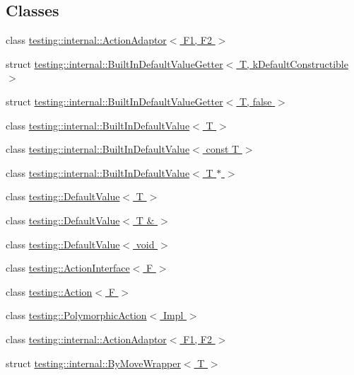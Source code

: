 \subsection*{Classes}
\begin{DoxyCompactItemize}
\item 
class \hyperlink{classtesting_1_1internal_1_1_action_adaptor}{testing\+::internal\+::\+Action\+Adaptor$<$ F1, F2 $>$}
\item 
struct \hyperlink{structtesting_1_1internal_1_1_built_in_default_value_getter}{testing\+::internal\+::\+Built\+In\+Default\+Value\+Getter$<$ T, k\+Default\+Constructible $>$}
\item 
struct \hyperlink{structtesting_1_1internal_1_1_built_in_default_value_getter_3_01_t_00_01false_01_4}{testing\+::internal\+::\+Built\+In\+Default\+Value\+Getter$<$ T, false $>$}
\item 
class \hyperlink{classtesting_1_1internal_1_1_built_in_default_value}{testing\+::internal\+::\+Built\+In\+Default\+Value$<$ T $>$}
\item 
class \hyperlink{classtesting_1_1internal_1_1_built_in_default_value_3_01const_01_t_01_4}{testing\+::internal\+::\+Built\+In\+Default\+Value$<$ const T $>$}
\item 
class \hyperlink{classtesting_1_1internal_1_1_built_in_default_value_3_01_t_01_5_01_4}{testing\+::internal\+::\+Built\+In\+Default\+Value$<$ T $\ast$ $>$}
\item 
class \hyperlink{classtesting_1_1_default_value}{testing\+::\+Default\+Value$<$ T $>$}
\item 
class \hyperlink{classtesting_1_1_default_value_3_01_t_01_6_01_4}{testing\+::\+Default\+Value$<$ T \& $>$}
\item 
class \hyperlink{classtesting_1_1_default_value_3_01void_01_4}{testing\+::\+Default\+Value$<$ void $>$}
\item 
class \hyperlink{classtesting_1_1_action_interface}{testing\+::\+Action\+Interface$<$ F $>$}
\item 
class \hyperlink{classtesting_1_1_action}{testing\+::\+Action$<$ F $>$}
\item 
class \hyperlink{classtesting_1_1_polymorphic_action}{testing\+::\+Polymorphic\+Action$<$ Impl $>$}
\item 
class \hyperlink{classtesting_1_1internal_1_1_action_adaptor}{testing\+::internal\+::\+Action\+Adaptor$<$ F1, F2 $>$}
\item 
struct \hyperlink{structtesting_1_1internal_1_1_by_move_wrapper}{testing\+::internal\+::\+By\+Move\+Wrapper$<$ T $>$}

\end{DoxyCompactItemize}
